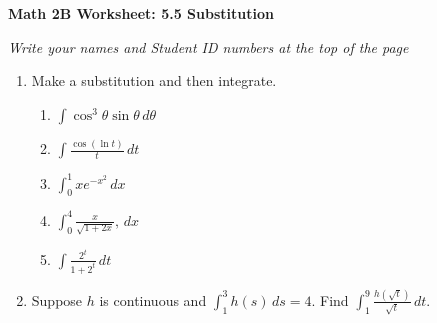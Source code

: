 \documentclass[12pt,fleqn]{article}
\begin{document}
\begin{center}
	\textbf{Math 2B Worksheet: 5.5 Substitution}
\end{center}

\emph{Write your names and Student ID numbers at the top of the page}


\begin{enumerate} 
\item Make a substitution and then integrate.
\begin{enumerate}

\item $\displaystyle\int\cos^3\theta\sin\theta\,d\theta$
\vfill

\item $\displaystyle\int\frac{\cos(\ln t)}{t}\,dt$
\vfill



\item $\displaystyle\int_0^1 xe^{-x^2}\,dx$
\vfill

\item $\displaystyle\int_0^4\frac{x}{\sqrt{1+2x}},\,dx$
\vfill





\item $\displaystyle\int \frac{2^t}{1+2^t}\,dt$
\end{enumerate}
\vfill


\newpage

\item Suppose $h$ is continuous and $\displaystyle\int_1^3 h(s)\,ds=4$.  Find $\displaystyle\int_1^9\frac{h(\sqrt{t})}{\sqrt{t}}\,dt$.

\vfill\vfill


\end{enumerate}
\end{document}
